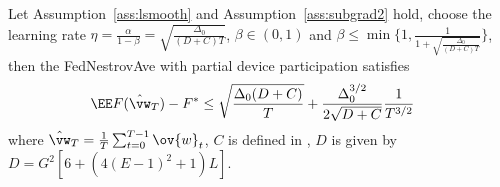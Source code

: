 

\begin{theorem}
	Let Assumption~\ref{ass:lsmooth} and Assumption~\ref{ass:subgrad2} hold,  choose the learning rate $\eta = \frac{\alpha}{1 - \beta} = \sqrt{\frac{\Delta_0}{(D+C)T}}$, $\beta \in (0, 1)$ and $\beta \leq \min\{1, \frac{1}{1 + \sqrt{\frac{\Delta_0}{(D+C)T}}}\}$, then the FedNestrovAve with partial device participation satisfies
	\begin{align}
		 \EE F(\hat{\vw}_T) - F^* &\leq \sqrt{\frac{\Delta_0(D + C)}{T}} + \frac{\Delta_0^{3/2}}{2\sqrt{D+C}}\frac{1}{T^{3/2}} 
	\end{align}
	where $\hat{\vw}_T = \frac{1}{T}\sum_{t=0}^{T-1} \ov{w}_t$, $C$ is defined in \eq{\ref{eq:partialsample}},
$D$ is given by $D =  G^2[6 + (4(E-1)^2+1)L]$.
\end{theorem}

